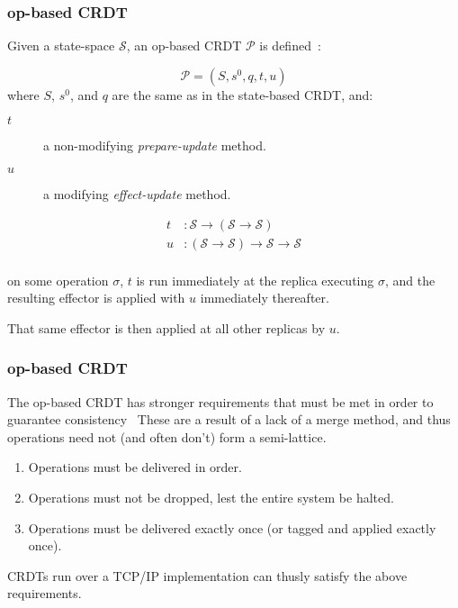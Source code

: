 \documentclass[aspectratio=169,compress]{beamer}
\begin{document}
  \begin{frame}
    \frametitle{op-based CRDT}

    Given a state-space $\mathcal{S}$, an op-based CRDT $\mathcal{P}$ is
    defined~\parencite{shapiro11}:

    \[
      \mathcal{P} = (S, s^0, q, t, u)
    \]
    where $S$, $s^0$, and $q$ are the same as in the state-based CRDT, and:
    \begin{description}
      \item[$t$] a non-modifying \textit{prepare-update} method.
      \item[$u$] a modifying \textit{effect-update} method.
    \end{description}

    \[
      \begin{aligned}
        t &: \mathcal{S} \to (\mathcal{S} \to \mathcal{S}) \\
        u &: (\mathcal{S} \to \mathcal{S}) \to \mathcal{S} \to \mathcal{S} \\
      \end{aligned}
    \]

    on some operation $\sigma$, $t$ is run immediately at the replica executing
    $\sigma$, and the resulting effector is applied with $u$ immediately
    thereafter.

    That same effector is then applied at all other replicas by $u$.
  \end{frame}

  \begin{frame}
    \frametitle{op-based CRDT}

    The op-based CRDT has stronger requirements that must be met in order to
    guarantee consistency~\citep{shapiro11} These are a result of a lack of a
    merge method, and thus operations need not (and often don't) form a
    semi-lattice.

    \begin{enumerate}
      \item Operations must be delivered in order.
      \item Operations must not be dropped, lest the entire system be halted.
      \item Operations must be delivered exactly once (or tagged and applied
        exactly once).
    \end{enumerate}

    CRDTs run over a TCP/IP implementation can thusly satisfy the above
    requirements.
  \end{frame}
\end{document}
